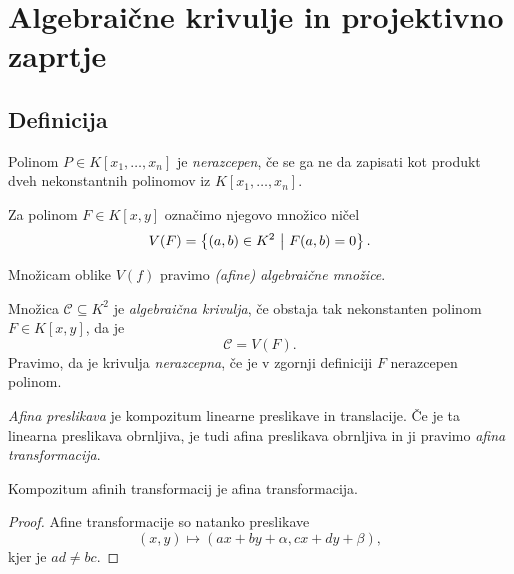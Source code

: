 \section{Algebraične krivulje in projektivno zaprtje}

\subsection{Definicija}


\begin{definicija}
Polinom $P \in K[x_1, \dots, x_n]$ je
\emph{nerazcepen}, če se ga ne da zapisati
kot produkt dveh nekonstantnih polinomov iz $K[x_1, \dots, x_n]$.
\end{definicija}

\begin{definicija}
Za polinom $F \in K[x,y]$ označimo njegovo množico ničel
\[
V(F) = \left\{(a,b) \in K^2~\middle\vert~F(a,b) = 0\right\}.
\]
\end{definicija}

\begin{opomba}
Množicam oblike $V(f)$ pravimo
\emph{(afine) algebraične množice}.
\end{opomba}

\begin{okvir}
\begin{definicija}
Množica $\mathcal{C} \subseteq K^2$ je
\emph{algebraična krivulja}, če obstaja
tak nekonstanten polinom $F \in K[x,y]$, da je
\[
\mathcal{C} = V(F).
\]
Pravimo, da je krivulja
\emph{nerazcepna}, če je v
zgornji definiciji $F$ nerazcepen polinom.
\end{definicija}
\end{okvir}

\begin{definicija}
\emph{Afina preslikava} je kompozitum
linearne preslikave in translacije. Če je ta linearna preslikava
obrnljiva, je tudi afina preslikava obrnljiva in ji pravimo
\emph{afina transformacija}.
\end{definicija}

\begin{trditev}
Kompozitum afinih transformacij je afina transformacija.
\end{trditev}

\begin{proof}
Afine transformacije so natanko preslikave
\[
(x,y) \mapsto (ax + by + \alpha, cx + dy + \beta),
\]
kjer je $ad \ne bc$.
\end{proof}

